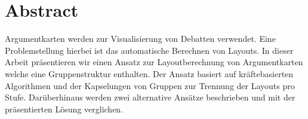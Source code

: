 \chapter*{Abstract}

Argumentkarten werden zur Visualisierung von Debatten verwendet. Eine Problemstellung hierbei ist das automatische Berechnen von Layouts.
In dieser Arbeit präsentieren wir einen Ansatz zur Layoutberechnung von Argumentkarten welche eine Gruppenstruktur enthalten. 
Der Ansatz basiert auf kräftebasierten Algorithmen und der Kapselungen von Gruppen zur Trennung der Layouts pro Stufe. Darüberhinaus werden zwei alternative Ansätze beschrieben
und mit der präsentierten Lösung verglichen.